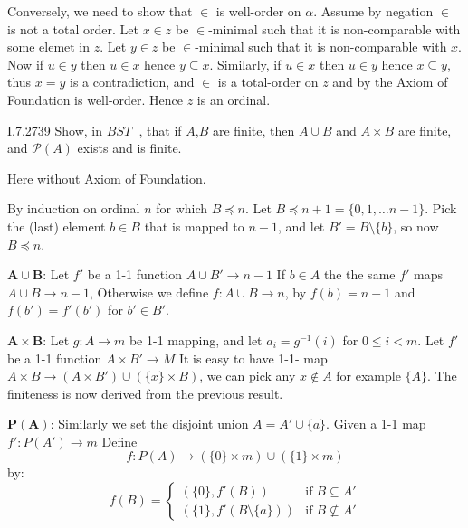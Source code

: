 Conversely, we need to show that \(\in\) is well-order on \(\alpha\).
Assume by negation \(\in\) is not a total order.
Let \(x\in z\) be \(\in\)-minimal such that it is non-comparable
with some elemet in $z$.
Let \(y\in z\) be \(\in\)-minimal such that it is non-comparable
with $x$.
Now if \(u\in y\) then \(u\in x\) hence \(y \subseteq x\).
Similarly, if \(u\in x\) then \(u\in y\) hence \(x \subseteq y\),
thus \(x = y\) is a contradiction, and \(\in\) is a total-order on $z$
and by the Axiom of Foundation is well-order. Hence $z$ is an ordinal.

\begin{lexcopy}{I.7.27}{39}
  Show, in \(BST^{-}\), that if $A$,$B$ are finite,
  then \(A\cup B\) and \(A\times B\)
are finite, and \(\mathcal{P}(A)\) exists and is finite.
\end{lexcopy}
Here without Axiom of Foundation.

By induction on ordinal $n$ for which \(B \preccurlyeq n\).
Let \(B \preccurlyeq n + 1 = \{0, 1, \ldots n - 1\}\).
Pick the (last) element \(b\in B\) that is mapped to \(n-1\),
and let \(B' = B \setminus \{b\}\), so now \(B \preccurlyeq n\).

\(\mathbf{A\cup B}\):
Let \(f'\) be a 1-1 function \(A \cup B' \to n - 1\)
If \(b\in A\) the the same \(f'\) maps  \(A \cup B \to n - 1\),
Otherwise we define \(f: A \cup B \to n\), by
\(f(b) = n - 1\) and \(f(b') = f'(b')\) for \(b'\in B'\).

\(\mathbf{A\times B}\):
Let \(g: A \to m\) be 1-1 mapping, and let \(a_i = g^{-1}(i)\)
for \(0 \leq i < m\).
Let \(f'\) be a 1-1 function \(A \times B' \to M\)
It is easy to have 1-1- map
\(A \times B \to (A \times B') \cup (\{x\} \times B)\),
we can pick any \(x\notin A\) for example \(\{A\}\).
The finiteness is now derived from the previous result.

\(\mathbf{P(A)}\): Similarly we
set the disjoint union \(A = A' \cup \{a\}\).
Given a 1-1 map \(f': P(A') \to m\)
Define
\begin{equation*}
f: P(A) \to (\{0\}\times m) \cup (\{1\}\times m)
\end{equation*}
by:
\begin{equation*}
f(B) =
\left\{
\begin{array}{ll}
(\{0\}, f'(B)) & \textrm{if}\; B \subseteq A' \\
(\{1\}, f'(B \setminus \{a\})) & \textrm{if}\; B \not\subseteq A'
\end{array}
\right.
\end{equation*}

